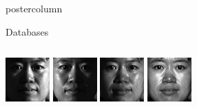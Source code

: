 \documentclass[final,hyperref={pdfpagelabels=false}]{beamer}
\begin{document}
\begin{frame}
\begin{columns}
\begin{column}{.49\textwidth}
\begin{beamercolorbox}[center,wd=\textwidth]{postercolumn}
\begin{minipage}[T]{.95\textwidth}
{\begin{block}{Databases}
\begin{columns}
\begin{column}{.39\textwidth}
                  \includegraphics[width=0.22\linewidth]{hanselmann-databases/cmupie/test/png/cropped/00-27-02}
                  \-
                  \includegraphics[width=0.22\linewidth]{hanselmann-databases/cmupie/test/png/cropped/00-27-17}
                  \-
                  \includegraphics[width=0.22\linewidth]{hanselmann-databases/cmupie/test/png/cropped/00-27-18}
                  \-
                  \includegraphics[width=0.22\linewidth]{hanselmann-databases/cmupie/test/png/cropped/00-27-20}
                \end{column}
              \end{columns}
            \end{block}
            \vfill
            
}
\end{minipage}
\end{beamercolorbox}
\end{column}
\end{columns}
\end{frame}
\end{document}
